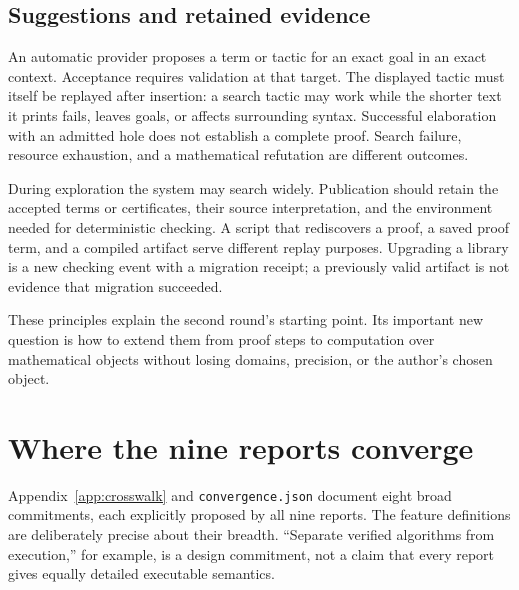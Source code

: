 \documentclass[11pt,letterpaper]{article}
\newcommand{\code}[1]{\nolinkurl{#1}}
\begin{document}
\subsection{Suggestions and retained evidence}
An automatic provider proposes a term or tactic for an exact goal in an exact
context. Acceptance requires validation at that target. The displayed tactic
must itself be replayed after insertion: a search tactic may work while the
shorter text it prints fails, leaves goals, or affects surrounding syntax.
Successful elaboration with an admitted hole does not establish a complete
proof. Search failure, resource exhaustion, and a mathematical refutation are
different outcomes.

During exploration the system may search widely. Publication should retain the
accepted terms or certificates, their source interpretation, and the environment
needed for deterministic checking. A script that rediscovers a proof, a saved
proof term, and a compiled artifact serve different replay purposes. Upgrading a
library is a new checking event with a migration receipt; a previously valid
artifact is not evidence that migration succeeded.

These principles explain the second round's starting point. Its important new
question is how to extend them from proof steps to computation over mathematical
objects without losing domains, precision, or the author's chosen object.

\section{Where the nine reports converge}\label{sec:convergence}
Appendix~\ref{app:crosswalk} and \code{convergence.json} document eight broad
commitments, each explicitly proposed by all nine reports. The feature
definitions are deliberately precise about their breadth. ``Separate verified
algorithms from execution,'' for example, is a design commitment, not a claim
that every report gives equally detailed executable semantics.
\end{document}
